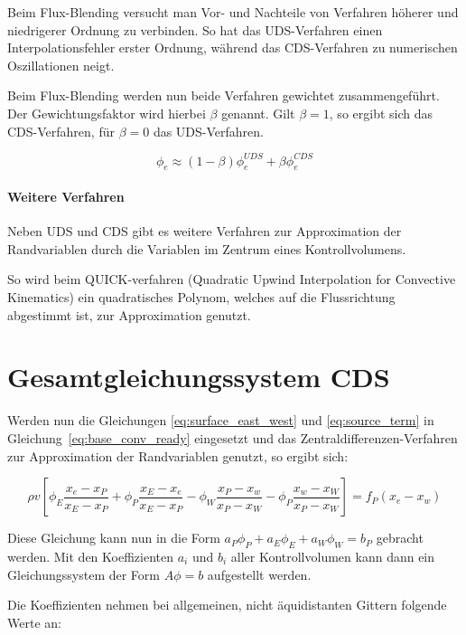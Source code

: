 \documentclass[10pt, ngerman,colorback,accentcolor=tud2d]{tudreport}
\begin{document}
Beim Flux-Blending versucht man Vor- und Nachteile von Verfahren höherer und niedrigerer
Ordnung zu verbinden. So hat das UDS-Verfahren einen Interpolationsfehler erster Ordnung,
während das CDS-Verfahren zu numerischen Oszillationen neigt.

Beim Flux-Blending werden nun beide Verfahren gewichtet zusammengeführt. Der Gewichtungsfaktor
wird hierbei $\beta$ genannt. Gilt $\beta = 1$, so ergibt sich das CDS-Verfahren, für
$\beta = 0$ das UDS-Verfahren.

\begin{equation}
  \phi_e \approx (1-\beta)\phi_e^{UDS} + \beta \phi_e^{CDS}
  \label{eq:flux_blending}
\end{equation}



\paragraph{Weitere Verfahren}
Neben UDS und CDS gibt es weitere Verfahren zur Approximation der Randvariablen durch
die Variablen im Zentrum eines Kontrollvolumens.

So wird beim QUICK-verfahren (Quadratic Upwind Interpolation for Convective
Kinematics) ein quadratisches Polynom, welches auf die Flussrichtung abgestimmt ist,
zur Approximation genutzt.

\section{Gesamtgleichungssystem CDS}

Werden nun die Gleichungen \eqref{eq:surface_east_west} und \eqref{eq:source_term}
in Gleichung~\eqref{eq:base_conv_ready} eingesetzt und das Zentraldifferenzen-Verfahren
zur Approximation der Randvariablen genutzt, so ergibt sich:

\begin{equation*}
  \rho v \left[{\phi_E \frac{x_e-x_P}{x_E-x_P} + \phi_P \frac{x_E-x_e}{x_E-x_P}
  -\phi_W \frac{x_P-x_w}{x_P-x_W} - \phi_P \frac{x_w-x_W}{x_P-x_W}
  }\right]
  = f_P(x_e-x_w)
\end{equation*}

Diese Gleichung kann nun in die Form $a_P \phi_P + a_E \phi_E + a_W \phi_W = b_P$
gebracht werden. Mit den Koeffizienten $a_i$ und $b_i$ aller Kontrollvolumen kann
dann ein Gleichungssystem der Form $A\phi = b$ aufgestellt werden.

Die Koeffizienten nehmen bei allgemeinen, nicht äquidistanten Gittern folgende Werte
an:
\end{document}
